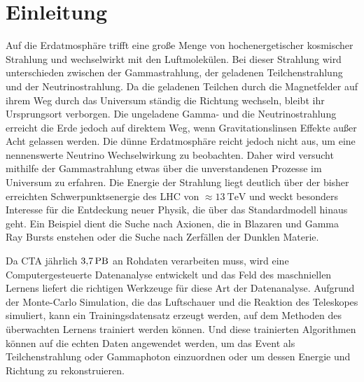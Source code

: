 \chapter{Einleitung}

Auf die Erdatmosphäre trifft eine große Menge von hochenergetischer kosmischer Strahlung und wechselwirkt mit den Luftmolekülen.
Bei dieser Strahlung wird unterschieden zwischen der Gammastrahlung, der geladenen Teilchenstrahlung und der Neutrinostrahlung.
Da die geladenen Teilchen durch die Magnetfelder auf ihrem Weg durch das Universum ständig die Richtung wechseln, bleibt ihr Ursprungsort
verborgen.
Die ungeladene Gamma- und die Neutrinostrahlung erreicht die Erde jedoch auf direktem Weg, wenn Gravitationslinsen Effekte
außer Acht gelassen werden. Die dünne Erdatmosphäre reicht jedoch nicht aus, um eine nennenswerte Neutrino Wechselwirkung zu beobachten.
Daher wird versucht mithilfe der Gammastrahlung etwas über die unverstandenen Prozesse im Universum zu erfahren.
Die Energie der Strahlung liegt deutlich über der bisher erreichten Schwerpunktsenergie des LHC von $\approx\SI{13}{\tera\eV}$\cite{LHC} und weckt
besonders Interesse für die Entdeckung neuer Physik, die über das Standardmodell hinaus geht.
Ein Beispiel dient die Suche nach Axionen, die in Blazaren und Gamma Ray Bursts enstehen oder die Suche nach Zerfällen der Dunklen Materie.

Da CTA jährlich $\SI{3.7}{\peta\byte}$\cite{Rohdaten} an Rohdaten verarbeiten muss, wird eine Computergesteuerte Datenanalyse
entwickelt und das Feld des maschniellen Lernens liefert die richtigen Werkzeuge für diese Art der Datenanalyse.
Aufgrund der Monte-Carlo Simulation, die das Luftschauer und die Reaktion des Teleskopes simuliert, kann ein Trainingsdatensatz erzeugt werden, auf dem
Methoden des überwachten Lernens trainiert werden können.
Und diese trainierten Algorithmen können auf die echten Daten angewendet werden, um das Event als Teilchenstrahlung oder
Gammaphoton einzuordnen oder um dessen Energie und Richtung zu rekonstruieren.

